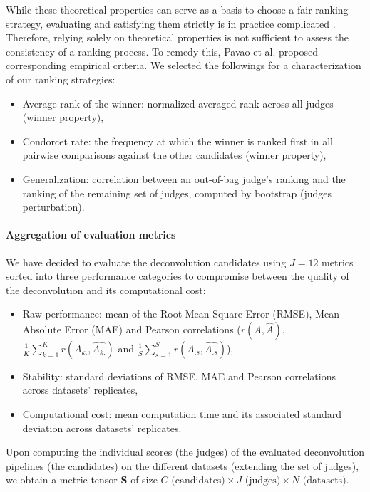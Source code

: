 \documentclass{article}
\begin{document}
While these theoretical properties can serve as a basis to choose a fair ranking strategy, evaluating and satisfying them strictly is in practice complicated \cite{arrow_1950_voting, gibbard_1973_voting}.
Therefore, relying solely on theoretical properties is not sufficient to assess the consistency of a ranking process.
To remedy this, Pavao et al. \cite{pavao_2021_judging} proposed corresponding empirical criteria.
We selected the followings for a characterization of our ranking strategies:
\begin{itemize}
    \item Average rank of the winner: normalized averaged rank across all judges (winner property),
    \item Condorcet rate: the frequency at which the winner is ranked first in all pairwise comparisons against the other candidates (winner property),
    \item Generalization: correlation between an out-of-bag judge's ranking and the ranking of the remaining set of judges, computed by bootstrap (judges perturbation).
\end{itemize}

\paragraph{Aggregation of evaluation metrics}\label{paragraph:evaluation-metrics-aggregation}

We have decided to evaluate the deconvolution candidates using $J=12$ metrics sorted into three performance categories to compromise between the quality of the deconvolution and its computational cost:
\begin{itemize}
    \item Raw performance: mean of the Root-Mean-Square Error (RMSE), Mean Absolute Error (MAE) and Pearson correlations ($r(A, \widehat{A})$, $\frac{1}{K} \sum_{k=1}^K r(A_{k.},  \widehat{A_{k.}})$ and $\frac{1}{S} \sum_{s=1}^S r(A_{.s}, \widehat{A_{.s}})$),
    \item Stability: standard deviations of RMSE, MAE and Pearson correlations across datasets' replicates,
    \item Computational cost: mean computation time and its associated standard deviation across datasets' replicates.
\end{itemize}
Upon computing the individual scores (the judges) of the evaluated deconvolution pipelines (the candidates) on the different datasets (extending the set of judges), we obtain a metric tensor $\mathbf{S}$ of size $C \text{ (candidates)} \times J \text{ (judges)} \times N \text{ (datasets)}$.
\end{document}
